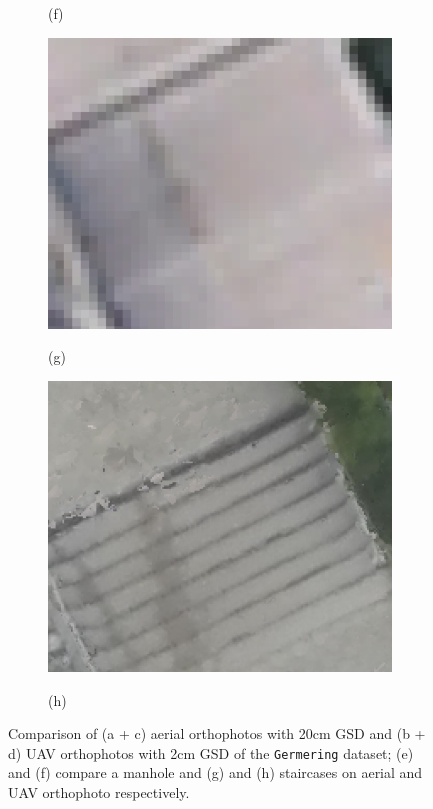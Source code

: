 \begin{figure}[tbp]
\begin{subfigure}[tbp]{0.241\columnwidth}
           {{\small }}    
           \centerline{\small{(f)}}\medskip
       \end{subfigure} 
        \hfill
       \begin{subfigure}[tbp]{0.241\columnwidth}
           \centering
           \includegraphics[width=\textwidth]{figures_5/germering_stair_aerial.png}
           {{\small }}    
           \centerline{\small{(g)}}\medskip
       \end{subfigure}
        \hfill
       \begin{subfigure}[tbp]{0.241\columnwidth}
           \centering
           \includegraphics[width=\textwidth]{figures_5/germering_stair_uav.png}
           {{\small }}    
           \centerline{\small{(h)}}\medskip
       \end{subfigure}       
       \caption{Comparison of (a + c) aerial orthophotos with 20cm GSD and (b + d) UAV orthophotos with 2cm GSD of the \texttt{Germering} dataset; (e) and (f) compare a manhole and (g) and (h) staircases on aerial and UAV orthophoto respectively.}
       \label{fig:ortho_germering}
\end{figure}

